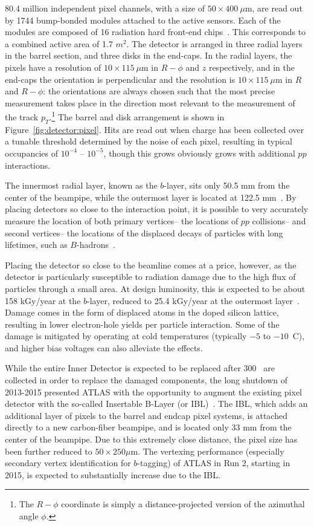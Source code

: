 80.4 million independent pixel channels, with a size of $50 \times 400~\mu$m, are read out by 1744 bump-bonded modules attached to the active sensors. Each of the modules are composed of 16 radiation hard front-end chips~\cite{ATLASPaper}. This corresponds to a combined active area of 1.7 $m^2$. The detector is arranged in three radial layers in the barrel section, and three disks in the end-caps. In the radial layers, the pixels have a resolution of $10 \times 115~\mu$m in $R-\phi$ and $z$ respectively, and in the end-caps the orientation is perpendicular and the resolution is $10 \times 115~\mu$m in $R$ and $R-\phi$: the orientations are always chosen such that the most precise measurement takes place in the direction most relevant to the measurement of the track $p_T$.\footnote{The $R-\phi$ coordinate is simply a distance-projected version of the azimuthal angle $\phi$.} The barrel and disk arrangement is shown in Figure~\ref{fig:detector:pixel}. Hits are read out when charge has been collected over a tunable threshold determined by the noise of each pixel, resulting in typical occupancies of $10^{-4}$ -- $10^{-5}$, though this grows obviously grows with additional $pp$ interactions.

The innermost radial layer, known as the $b$-layer, sits only 50.5 mm from the center of the beampipe, while the outermost layer is located at 122.5 mm~\cite{ATLASPaper}. By placing detectors so close to the interaction point, it is possible to very accurately measure the location of both  primary vertices-- the locations of $pp$ collisions-- and second vertices-- the locations of the displaced decays of particles with long lifetimes, such as $B$-hadrons~\cite{ATLASExpected}.

Placing the detector so close to the beamline comes at a price, however, as the detector is particularly susceptible to radiation damage due to the high flux of particles through a small area. At design luminosity, this is expected to be about 158 kGy/year at the $b$-layer, reduced to 25.4 kGy/year at the outermost layer~\cite{ATLASPaper}. Damage comes in the form of displaced atoms in the doped silicon lattice, resulting in lower electron-hole yields per particle interaction. Some of the damage is mitigated by operating at cold temperatures (typically $-5$ to $-10$\degree~C), and higher bias voltages can also alleviate the effects.

While the entire Inner Detector is expected to be replaced after 300 \ifb~are collected in order to replace the damaged components, the long shutdown of 2013-2015 presented ATLAS with the opportunity to augment the existing pixel detector with the so-called Insertable B-Layer (or IBL)~\cite{ATLASIBL}. The IBL, which adds an additional layer of pixels to the barrel and endcap pixel systems, is attached directly to a new carbon-fiber beampipe, and is located only 33 mm from the center of the beampipe. Due to this extremely close distance, the pixel size has been further reduced to $50 \times 250 \mu$m. The vertexing performance (especially secondary vertex identification for $b$-tagging) of ATLAS in Run 2, starting in 2015, is expected to substantially increase due to the IBL. 

